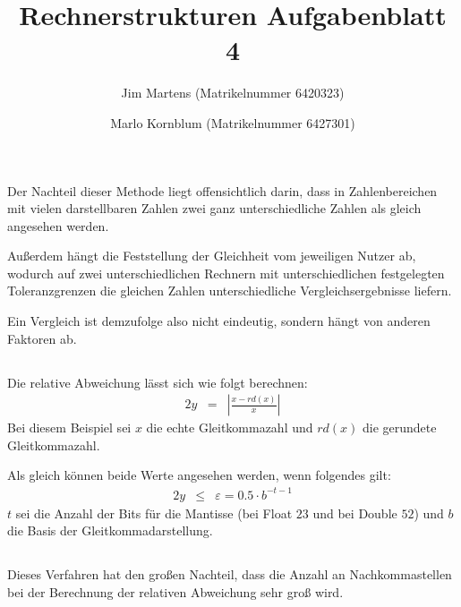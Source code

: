 \documentclass[10pt,a4paper,oneside,ngerman,numbers=noenddot]{scrartcl}
\begin{document}
\author{Jim Martens (Matrikelnummer 6420323) \and Marlo Kornblum (Matrikelnummer 6427301)}
\title{Rechnerstrukturen Aufgabenblatt 4}
\maketitle

\section{}%
\subsection{} %
Der Nachteil dieser Methode liegt offensichtlich darin, dass in Zahlenbereichen mit vielen darstellbaren Zahlen zwei ganz unterschiedliche Zahlen als gleich angesehen werden.

Außerdem hängt die Feststellung der Gleichheit vom jeweiligen Nutzer ab, wodurch auf zwei unterschiedlichen Rechnern mit unterschiedlichen festgelegten Toleranzgrenzen die gleichen Zahlen unterschiedliche Vergleichsergebnisse liefern.

Ein Vergleich ist demzufolge also nicht eindeutig, sondern hängt von anderen Faktoren ab.
\subsection{} %
Die relative Abweichung lässt sich wie folgt berechnen:
\begin{alignat*}{2}
y &=& |\frac{x - rd(x)}{x}|
\end{alignat*}
Bei diesem Beispiel sei $x$ die echte Gleitkommazahl und $rd(x)$ die gerundete Gleitkommazahl.

Als gleich können beide Werte angesehen werden, wenn folgendes gilt:
\begin{alignat*}{2}
y &\leq & \varepsilon = 0.5 \cdot b^{-t-1}
\end{alignat*}
$t$ sei die Anzahl der Bits für die Mantisse (bei Float $23$ und bei Double $52$) und $b$ die Basis der Gleitkommadarstellung.

\subsection{} %
Dieses Verfahren hat den großen Nachteil, dass die Anzahl an Nachkommastellen bei der Berechnung der relativen Abweichung sehr groß wird.

\section{}%
\end{document}
